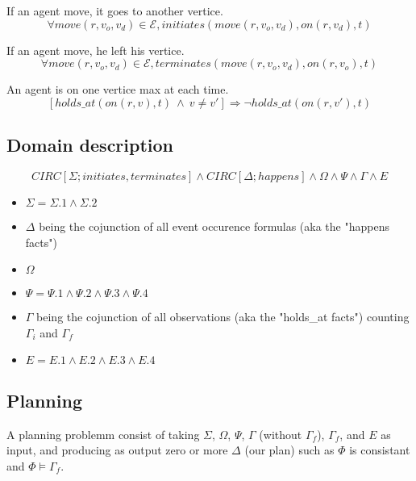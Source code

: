 If an agent move, it goes to another vertice.
\begin{equation}
  \tag{$\Sigma$.1}
  \forall move(r,v_o,v_d) \in \mathcal{E},initiates(move(r,v_o,v_d),on(r,v_d),t)
\end{equation}

If an agent move, he left his vertice.
\begin{equation}
  \tag{$\Sigma$.2}
  \forall move(r,v_o,v_d) \in \mathcal{E},terminates(move(r,v_o,v_d),on(r,v_o),t)
\end{equation}

\iffalse
A vertice has place for one agent only at each time.
\begin{equation}
  \tag{$\Psi$.2}
  [holds\_at(on(r,v),t)\ \land\ r\neq r']\Rightarrow \neg holds\_at(on(r',v),t)
\end{equation}
\fi

An agent is on one vertice max at each time.
\begin{equation}
  \tag{$\Psi$.3}
  [holds\_at(on(r,v),t)\ \land\ v\neq v']\Rightarrow \neg holds\_at(on(r,v'),t)
\end{equation}

\iffalse
Agents cannot switch places
\begin{multline}
  \tag{$\Psi$.4}
  [holds\_at(on(r,v),t)\ \land\ holds\_at(on(r',v'),t)\ \land\ holds\_at(on(r',v),t+1) \\ \land\ v\neq v'\ \land\ r\neq r'] \Rightarrow \neg holds\_at(on(r,v'),t+1)
\end{multline}
\fi

\subsection{Domain description}
\begin{equation}
  \tag{$\Phi$}
  CIRC[\Sigma;initiates,terminates] \land CIRC[\Delta;happens] \land \Omega \land \Psi \land \Gamma \land E
\end{equation}
\begin{itemize}
  \item $\Sigma = \Sigma.1 \land \Sigma.2$
  \item $\Delta$ being the cojunction of all event occurence formulas (aka the "happens facts")
  \item $\Omega$
  \item $\Psi = \Psi .1 \land \Psi .2 \land \Psi .3 \land \Psi .4$
  \item $\Gamma$ being the cojunction of all observations (aka the "holds\_at facts") counting $\Gamma_i$ and $\Gamma_f$
  \item $E = E.1 \land E.2 \land E.3 \land E.4$
\end{itemize}

\subsection{Planning}

A planning problemm consist of taking $\Sigma$, $\Omega$, $\Psi$, $\Gamma$ (without $\Gamma_f$), $\Gamma_f$, and $E$ as input,
and producing as output zero or more $\Delta$ (our plan) such as $\Phi$ is consistant and $\Phi\models\Gamma_f$.
